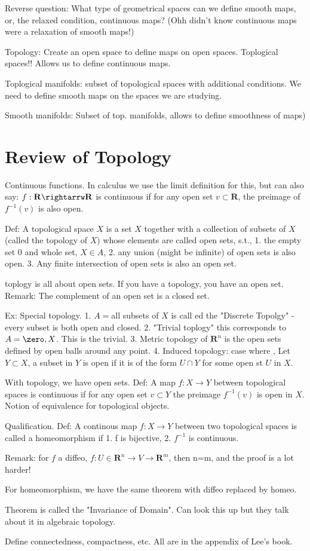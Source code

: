 \documentclass[12pt,letterpaper]{article}
\begin{document}
Reverse question: What type of geometrical spaces can we define smooth maps, or, the relaxed condition, continuous maps? (Ohh didn't know continuous maps were a relaxation of smooth maps!)

Topology: Create an open space to define maps on open spaces. Toplogical spaces!! Allows us to define continuous maps. 

Toplogical manifolds: subset of topological spaces with additional conditions. We need to define smooth maps on the spaces we are studying. 

Smooth manifolds: Subset of top. manifolds, allows to define smoothness of maps)

\section{Review of Topology}

Continuous functions. In calculus we use the limit definition for this, but can also say: $f: \mathbf{R} \rightarrw \mathbf{R}$ is continuous if for any open set $v \subset \mathbf{R}$, the preimage of $f^{-1}(v)$ is also open. 

Def: A topological space $X$ is a set $X$ together with a collection of subsets of $X$ (called the topology of $X$) whose elements are called open sets, s.t., 1. the empty set ${0}$ and whole set, $X \in A$, 2. any union (might be infinite) of open sets is also open. 3. Any finite intersection of open sets is also an open set. 

toplogy is all about open sets. If you have a topology, you have an open set. Remark: The complement of an open set is a closed set. 

Ex: Special topology. 1. $A = ${all subsets of $X$} is call ed the "Discrete Topolgy" - every subset is both open and closed.  2. "Trivial toplogy" this corresponds to $A = {\zero , X}$. This is the trivial. 3. Metric topology of $\mathbf{R}^n$ is the open sets defined by open balls around any point.  4. Induced topology: case where , Let $Y \subset X$, a subset in $Y$ is open if it is of the form $U \cap Y$ for some open st $U$ in $X$.


With topology, we have open sets. Def: A map $f: X \rightarrow Y$ between topological spaces is continuous if for any open set $v \subset Y$ the preimage $f^{-1}(v) $ is open in $X$. Notion of equivalence for topological objects.

Qualification. Def: A continous map $f: X \rightarrow Y$ between two topological spaces is called a homeomorphism if 1. f is bijective, 2. $f^{-1}$ is continuous. 

Remark: for $f$ a diffeo, $f: U \in \mathbf{R}^n \rightarrow V \rightarrow \mathbf{R}^m$, then n=m, and the proof is a lot harder!

For homeomorphism, we have the same theorem with diffeo replaced by homeo. 

Theorem is called the "Invariance of Domain". Can look this up but they talk about it in algebraic topology. 

Define connectedness, compactness, etc. All are in the appendix of Lee's book. 
\end{document}

